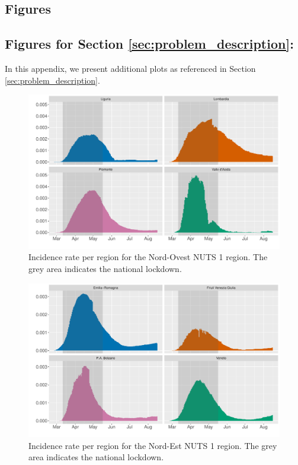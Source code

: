 \documentclass[12pt]{article}
\begin{document}
\begin{appendices}
		\section{Figures} \label{app:figures}
		
		\subsection{Figures for Section \ref{sec:problem_description}: } \label{sapp:figures_problem_description}
		In this appendix, we present additional plots as referenced in Section \ref{sec:problem_description}.
		
		\begin{figure}[H]
    	    \centering
    	    \includegraphics[width=0.94\linewidth]{output/infective_rates_Nord-Ovest.pdf}
    	    \caption{Incidence rate per region for the Nord-Ovest NUTS 1 region. The grey area indicates the national lockdown.}
    	    \label{fig:incidence_nordovest}
    	\end{figure}
    	
    	\begin{figure}[H]
    	    \centering
    	    \includegraphics[width=0.94\linewidth]{output/infective_rates_Nord-Est.pdf}
    	    \caption{Incidence rate per region for the Nord-Est NUTS 1 region. The grey area indicates the national lockdown.}
    	    \label{fig:incidence_nordest}
    	\end{figure}
    	

\end{appendices}
\end{document}
